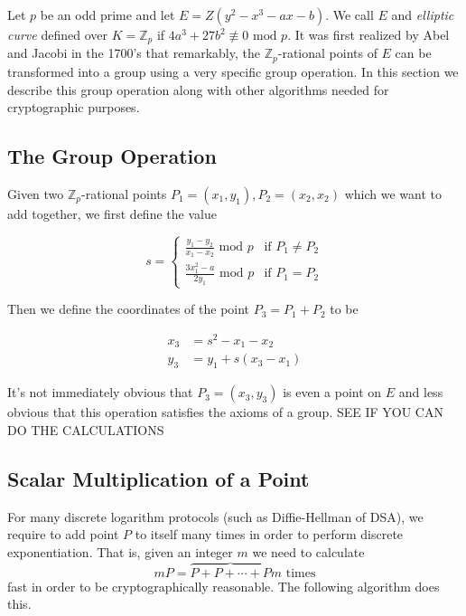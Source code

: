 %


Let $p$ be an odd prime and let $E = Z( y^2 - x^3 - ax - b)$. We call $E$ and \textit{elliptic curve} defined over $K = \mathbb{Z}_p$ if $4a^3 + 27b^2 \not\equiv 0 \text{ mod } p$. It was first realized by {\color{red}Abel and Jacobi in the 1700's} that remarkably, the $\mathbb{Z}_p$-rational points of $E$ can be transformed into a group using a very specific group operation. In this section we describe this group operation along with other algorithms needed for cryptographic purposes. 

\subsection{The Group Operation}  

Given two $\mathbb{Z}_p$-rational points $P_1 = (x_1,y_1),P_2=(x_2,x_2)$ which we want to add together, we first define the value 

$$ s =
\begin{cases}
\frac{y_1 - y_2}{x_1 - x_2} \text{ mod } p 	&\text{if } P_1 \neq P_2 \\
\frac{3x_1^2 - a}{2y_1} 	\text{ mod } p	&\text{if } P_1 = P_2 
\end{cases} 
$$ 

Then we define the coordinates of the point $P_3 = P_1 + P_2 $ to be 

\begin{align*}
	x_3 &= s^2 - x_1 - x_2  \\ 
	y_3 &= y_1 + s(x_3 - x_1) 
\end{align*}

It's not immediately obvious that $P_3 = (x_3,y_3)$ is even a point on $E$ and less obvious that this operation satisfies the axioms of a group. {\color{blue} SEE IF YOU CAN DO THE CALCULATIONS} 

\subsection{Scalar Multiplication of a Point}

For many discrete logarithm protocols (such as Diffie-Hellman of DSA), we require to add point $P$ to itself many times in order to perform discrete exponentiation. That is, given an integer $m$ we need to calculate $$mP = \overbrace{P + P + \cdots + P}{m \text{ times}}$$ fast in order to be cryptographically reasonable. The following algorithm does this. 


